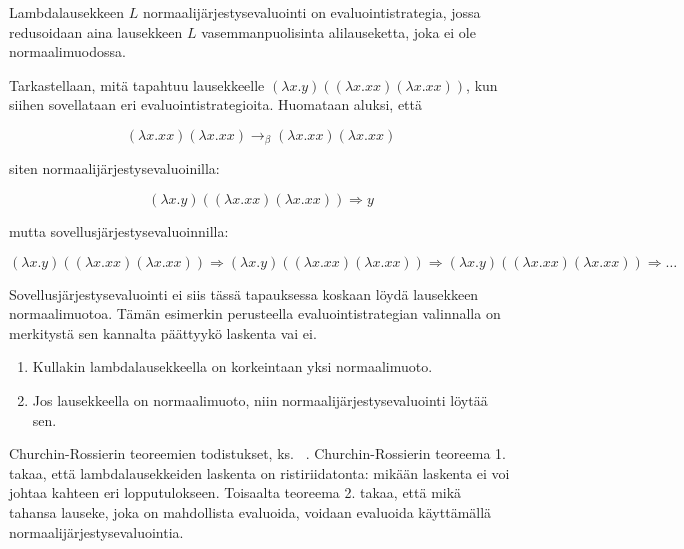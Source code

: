 \begin{alg}[normaalijärjestysevaluointi]
Lambdalausekkeen $L$ normaalijärjestysevaluointi on evaluointistrategia, jossa redusoidaan aina lausekkeen $L$ vasemmanpuolisinta alilauseketta, joka ei ole normaalimuodossa.
\end{alg}

\begin{esim}
Tarkastellaan, mitä tapahtuu lausekkeelle $(\lambda x . y) ((\lambda x . xx) (\lambda x . xx))$, kun siihen sovellataan eri evaluointistrategioita. Huomataan aluksi, että  

\[ (\lambda x . xx) (\lambda x . xx) \rightarrow_{\beta} (\lambda x . xx) (\lambda x . xx) \]

siten normaalijärjestysevaluoinilla:

\[ (\lambda x . y) ((\lambda x . xx) (\lambda x . xx)) \Longrightarrow y \]

mutta sovellusjärjestysevaluoinnilla:

\[  (\lambda x . y) ((\lambda x . xx) (\lambda x . xx)) \Longrightarrow
	(\lambda x . y) ((\lambda x . xx) (\lambda x . xx)) \Longrightarrow
	(\lambda x . y) ((\lambda x . xx) (\lambda x . xx)) \Longrightarrow \ldots \]
	
Sovellusjärjestysevaluointi ei siis tässä tapauksessa koskaan löydä lausekkeen normaalimuotoa. Tämän esimerkin perusteella evaluointistrategian valinnalla on merkitystä sen kannalta päättyykö laskenta vai ei. 
\end{esim}


\begin{lau}
\begin{enumerate} $ $\newline
	\item Kullakin lambdalausekkeella on korkeintaan yksi normaalimuoto.
	\item Jos lausekkeella on normaalimuoto, niin normaalijärjestysevaluointi löytää sen. 
\end{enumerate}
\end{lau}

Churchin-Rossierin teoreemien todistukset, ks. ~\cite[s.~23--30]{HBEB2000}. Churchin-Rossierin teoreema 1. takaa, että lambdalausekkeiden laskenta on ristiriidatonta: mikään laskenta ei voi johtaa kahteen eri lopputulokseen. Toisaalta teoreema 2. takaa, että mikä tahansa lauseke, joka on mahdollista evaluoida, voidaan evaluoida käyttämällä normaalijärjestysevaluointia.

\par

